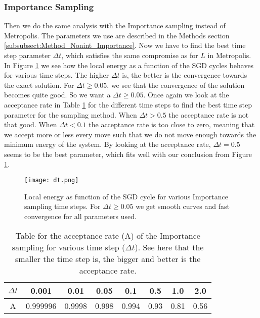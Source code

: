 \documentclass[12pt,a4paper,english]{article}
\begin{document}
\subsubsection{Importance Sampling}
\label{subsubsect:Results_nonint_Importance}
Then we do the same analysis with the Importance sampling instead of Metropolis. The parameters we use are described in the Methods section \ref{subsubsect:Method_Nonint_Importance}. Now we have to find the best time step parameter $\Delta t$, which satisfies the same compromise as for $L$ in Metropolis. In Figure \ref{fig:check_dt} we see how the local energy as a function of the SGD cycles behaves for various time steps. The higher $\Delta t$ is, the better is the convergence towards the exact solution. For $\Delta t\geq 0.05$, we see that the convergence of the solution becomes quite good. So we want a $\Delta t\geq0.05$. Once again we look at the acceptance rate in Table \ref{tab:Imp_A} for the different time steps to find the best time step parameter for the sampling method. When $\Delta t>0.5$ the acceptance rate is not that good. When $\Delta t<0.1$ the acceptance rate is too close to zero, meaning that we accept more or less every move such that we do not move enough towards the minimum energy of the system. By looking at the acceptance rate, $\Delta t=0.5$ seems to be the best parameter, which fits well with our conclusion from Figure \ref{fig:check_dt}.

\begin{figure}[t!]
	\centering\texttt{[image: dt.png]}
	\caption{Local energy as function of the SGD cycle for various Importance sampling time steps. For $\Delta t\geq0.05$ we get smooth curves and fast convergence for all parameters used. \label{fig:check_dt}}
\end{figure}

\begin{table}[htbp!]
	\centering
	\begin{tabular}{|c|c|c|c|c|c|c|c|}
		\hline \rule{0pt}{13pt}
		$\Delta t$ & 0.001 & 0.01 & 0.05 & 0.1 & 0.5 & 1.0 & 2.0 \\
		\hline \rule{0pt}{13pt}
		A & 0.999996 & 0.9998 & 0.998 & 0.994 & 0.93 & 0.81 & 0.56 \\
		\hline
	\end{tabular}
	\caption{Table for the acceptance rate (A) of the Importance sampling for various time step ($\Delta t$). See here that the smaller the time step is, the bigger and better is the acceptance rate. \label{tab:Imp_A}}
\end{table}
\end{document}
